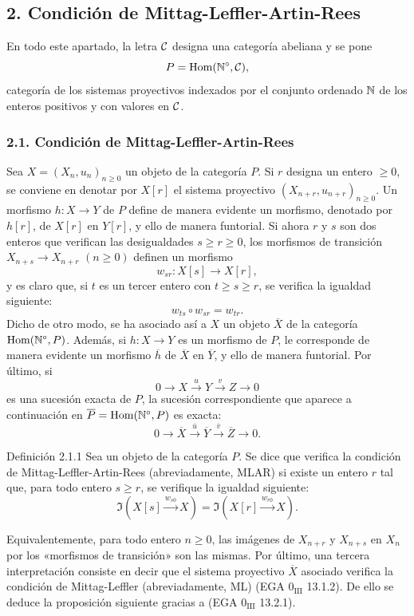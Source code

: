 \subsection*{2. Condición de Mittag-Leffler-Artin-Rees}
En todo este apartado, la letra $\mathcal C$ designa una categoría abeliana y se pone
\[
P=\operatorname{Hom}(\mathbb N^\circ,\mathcal C),
\]
categoría de los sistemas proyectivos indexados por el conjunto ordenado $\mathbb N$ de los enteros positivos y con valores en $\mathcal C$.

\subsubsection*{2.1. Condición de Mittag-Leffler-Artin-Rees}
Sea $X=(X_n,u_n)_{n\ge0}$ un objeto de la categoría $P$. Si $r$ designa un entero $\ge0$, se conviene en denotar por $X[r]$ el sistema proyectivo $(X_{n+r},u_{n+r})_{n\ge0}$. Un morfismo $h:X\to Y$ de $P$ define de manera evidente un morfismo, denotado por $h[r]$, de $X[r]$ en $Y[r]$, y ello de manera funtorial. Si ahora $r$ y $s$ son dos enteros que verifican las desigualdades $s\ge r\ge0$, los morfismos de transición $X_{n+s}\to X_{n+r}$ $(n\ge0)$ definen un morfismo
\[
w_{sr}:X[s]\longrightarrow X[r],
\]
y es claro que, si $t$ es un tercer entero con $t\ge s\ge r$, se verifica la igualdad siguiente:
\[
w_{ts}\circ w_{sr}=w_{tr}.
\]
Dicho de otro modo, se ha asociado así a $X$ un objeto $\overline X$ de la categoría $\operatorname{Hom}(\mathbb N^\circ,P)$. Además, si $h:X\to Y$ es un morfismo de $P$, le corresponde de manera evidente un morfismo $\overline h$ de $\overline X$ en $\overline Y$, y ello de manera funtorial. Por último, si
\[
0\longrightarrow X\stackrel{u}{\longrightarrow}Y\stackrel{v}{\longrightarrow}Z\longrightarrow0
\]
es una sucesión exacta de $P$, la sucesión correspondiente que aparece a continuación en $\overline P=\operatorname{Hom}(\mathbb N^\circ,P)$ es exacta:
\[
0\longrightarrow\overline X\stackrel{\overline u}{\longrightarrow}\overline Y\stackrel{\overline v}{\longrightarrow}\overline Z\longrightarrow0.
\]

\begin{statement}{Definición 2.1.1}
Sea un objeto de la categoría $P$. Se dice que verifica la condición de Mittag-Leffler-Artin-Rees (abreviadamente, MLAR) si existe un entero $r$ tal que, para todo entero $s\ge r$, se verifique la igualdad siguiente:
\[
\Im(X[s]\xrightarrow{w_{s0}}X)=\Im(X[r]\xrightarrow{w_{r0}}X).
\]
\end{statement}
Equivalentemente, para todo entero $n\ge0$, las imágenes de $X_{n+r}$ y $X_{n+s}$ en $X_n$ por los «morfismos de transición» son las mismas. Por último, una tercera interpretación consiste en decir que el sistema proyectivo $\overline X$ asociado verifica la condición de Mittag-Leffler (abreviadamente, ML) (EGA $0_{\mathrm{III}}$ 13.1.2). De ello se deduce la proposición siguiente gracias a (EGA $0_{\mathrm{III}}$ 13.2.1).


